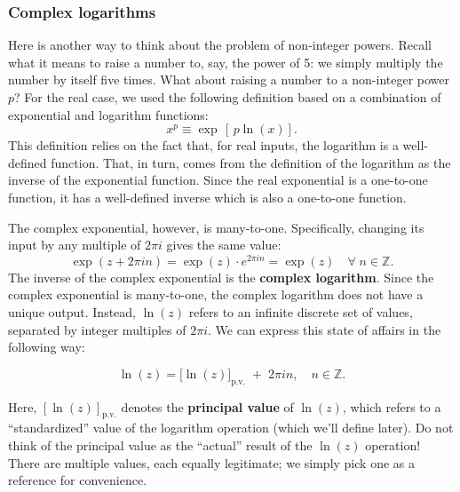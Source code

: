 \documentclass[10pt,a4paper]{article}
\begin{document}
\subsubsection{Complex logarithms}\label{complex-logarithms}

Here is another way to think about the problem of non-integer powers.
Recall what it means to raise a number to, say, the power of 5: we
simply multiply the number by itself five times. What about raising a
number to a non-integer power $p$? For the real case, we used the
following definition based on a combination of exponential and
logarithm functions:
\begin{equation}
x^p \equiv \exp\,\left[\,p\ln(x)\right].
\end{equation}
This definition relies on the fact that, for real inputs, the logarithm
is a well-defined function. That, in turn, comes from the definition of
the logarithm as the inverse of the exponential function. Since the real
exponential is a one-to-one function, it has a well-defined inverse
which is also a one-to-one function.

The complex exponential, however, is many-to-one. Specifically, changing
its input by any multiple of $2\pi i$ gives the same value:
\begin{equation}
\exp(z + 2\pi i n) = \exp(z) \cdot e^{2\pi i n} = \exp(z) \quad \forall\; n \in \mathbb{Z}.
\end{equation}
The inverse of the complex exponential is the \textbf{complex
logarithm}. Since the complex exponential is many-to-one, the complex
logarithm does not have a unique output. Instead, $\ln(z)$ refers to
an infinite discrete set of values, separated by integer multiples of
$2\pi i$. We can express this state of affairs in the following way:

\begin{framed}
\begin{equation}
\ln(z) = \big[\ln(z)\big]_{\mathrm{p.v.}}\; +\; 2 \pi i n, \quad n \in \mathbb{Z}.
\end{equation}
\end{framed}

Here, $[\ln(z)]_{\mathrm{p.v.}}$ denotes the \textbf{principal value}
of $\ln(z)$, which refers to a ``standardized'' value of the logarithm
operation (which we'll define later). Do not think of the principal
value as the ``actual'' result of the $\ln(z)$ operation! There are
multiple values, each equally legitimate; we simply pick one as a
reference for convenience.
\end{document}
